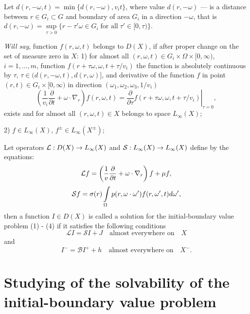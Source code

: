 \documentclass[12pt,reqno]{report}
\begin{document}
Let $d(r,-\omega,t)=\min\{d(r,-\omega), v_i t \}$, where value $d(r,-\omega)$ --- is a distance between $r \in G_i \subset G$ and boundary of area $G_i$ in a direction $-\omega$, that is
$d(r,-\omega) = \sup \limits_{\tau
	> 0} \{ r- \tau' \omega \in G_i \; \text{for all} \; \tau' \in [0,\tau) \}$.

{\it Will say}, function $f(r,\omega,t)$ belongs to
$D(X)$, if after proper change on the set of measure zero in $X$:
1) for almost all $(r,\omega,t) \in G_i \times \Omega
\times [0,\infty)$, $i=1,...,m$, function $f(r+\tau\omega,\omega,t+\tau/v_i)$
the function is absolutely continuous by $\tau,\,\tau \in
(d(r,-\omega,t), d(r,\omega)]$, and derivative of the function $f$ in point $(r,t)\in G_i \times [0,\infty)$ in direction $(\omega_1,\omega_2,\omega_3,1/v_i)$
$$ 
\left (\frac{1}{v_i} \frac{\partial }{\partial t } + \omega
\cdot \nabla_r \right) f(r,\omega,t)= \left.
\frac{\partial}{\partial \tau}
f\left(r+\tau\omega,\omega,t+\tau/v_i\right) \right |_{\tau=0},
$$
exists and for almost all $(r,\omega,t) \in X$ belongs to space $L_{\infty}
(X)$;

2) $f \in L_{\infty} (X)$, $f^{\pm}\in L_{\infty} (X^{\pm})$;



Let operators ${\cal L}: D(X) \to L_{\infty}(X)$ and ${\cal S}:
L_{\infty}(X) \to L_{\infty}(X)$ define by the equations:
\begin{equation}
{\cal L} f = \left (\frac{1}{v} \frac{\partial }{\partial t } +
\omega \cdot \nabla_r \right) f + \mu f,
\end{equation}
\begin{equation}
{\cal S}f= \sigma(r)
\int\limits_{\Omega} p(r,\omega \cdot
\omega')f(r,\omega',t)d\omega',
\end{equation}
then a function $I \in D(X)$ is called {a solution for the initial-boundary value problem (1) - (4)}
if it satisfies the following conditions
\begin{equation}
{\mathcal L} I = {\mathcal S}I + J \quad \text{almost everywhere on} \quad X
\end{equation}
and
\begin{equation}
I^-= {\mathcal B}I^+ + h \quad \text{almost everywhere on} \quad X^-.
\end{equation}



\section{Studying of the solvability of the initial-boundary value problem}
\end{document}
